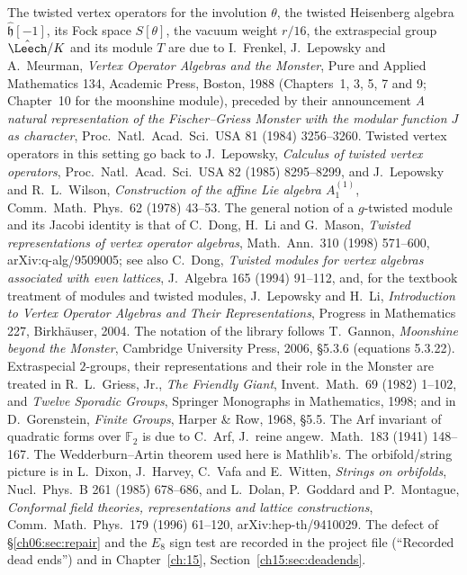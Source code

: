 The twisted vertex operators for the involution $\theta$, the twisted Heisenberg algebra
$\hat{\mathfrak h}[-1]$, its Fock space $S[\theta]$, the vacuum weight $r/16$, the extraspecial group
$\hat\Leech/K$ and its module $T$ are due to I.~Frenkel, J.~Lepowsky and A.~Meurman, \emph{Vertex
Operator Algebras and the Monster}, Pure and Applied Mathematics 134, Academic Press, Boston, 1988
(Chapters~1, 3, 5, 7 and 9; Chapter~10 for the moonshine module), preceded by their announcement
\emph{A natural representation of the Fischer--Griess Monster with the modular function $J$ as
character}, Proc.\ Natl.\ Acad.\ Sci.\ USA 81 (1984) 3256--3260.  Twisted vertex operators in this
setting go back to J.~Lepowsky, \emph{Calculus of twisted vertex operators}, Proc.\ Natl.\ Acad.\
Sci.\ USA 82 (1985) 8295--8299, and J.~Lepowsky and R.~L.~Wilson, \emph{Construction of the affine
Lie algebra $A_1^{(1)}$}, Comm.\ Math.\ Phys.\ 62 (1978) 43--53.  The general notion of a $g$-twisted
module and its Jacobi identity is that of C.~Dong, H.~Li and G.~Mason, \emph{Twisted
representations of vertex operator algebras}, Math.\ Ann.\ 310 (1998) 571--600, arXiv:q-alg/9509005;
see also C.~Dong, \emph{Twisted modules for vertex algebras associated with even lattices}, J.\
Algebra 165 (1994) 91--112, and, for the textbook treatment of modules and twisted modules,
J.~Lepowsky and H.~Li, \emph{Introduction to Vertex Operator Algebras and Their Representations},
Progress in Mathematics 227, Birkh\"auser, 2004.  The notation of the library follows T.~Gannon,
\emph{Moonshine beyond the Monster}, Cambridge University Press, 2006, \S5.3.6 (equations 5.3.22).
Extraspecial $2$-groups, their representations and their role in the Monster are treated in
R.~L.~Griess, Jr., \emph{The Friendly Giant}, Invent.\ Math.\ 69 (1982) 1--102, and \emph{Twelve
Sporadic Groups}, Springer Monographs in Mathematics, 1998; and in D.~Gorenstein, \emph{Finite
Groups}, Harper \& Row, 1968, \S5.5.  The Arf invariant of quadratic forms over $\mathbb F_2$ is
due to C.~Arf, J.\ reine angew.\ Math.\ 183 (1941) 148--167.  The Wedderburn--Artin theorem used
here is Mathlib's.  The orbifold/string picture is in L.~Dixon, J.~Harvey, C.~Vafa and E.~Witten,
\emph{Strings on orbifolds}, Nucl.\ Phys.\ B 261 (1985) 678--686, and L.~Dolan, P.~Goddard and
P.~Montague, \emph{Conformal field theories, representations and lattice constructions}, Comm.\
Math.\ Phys.\ 179 (1996) 61--120, arXiv:hep-th/9410029.  The defect of \S\ref{ch06:sec:repair} and
the $E_8$ sign test are recorded in the project file \leanpath{Notes/MonsterRoadmap.md} (``Recorded dead ends'') and
in Chapter~\ref{ch:15}, Section~\ref{ch15:sec:deadends}.

\endgroup
